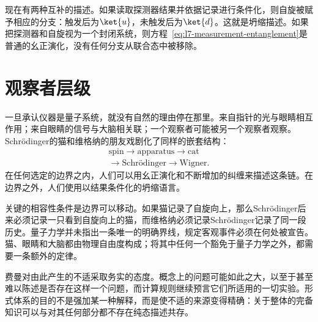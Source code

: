 现在有两种互补的描述。如果读取探测器结果并依据记录进行条件化，则自旋被赋予相应的分支：触发后为\(\ket{u}\)，未触发后为\(\ket{d}\)。这就是坍缩描述。如果把探测器和自旋视为一个封闭系统，则方程~\eqref{eq:l7-measurement-entanglement}是普通的幺正演化，没有任何分支从联合态中被移除。

\begin{classroomqa}
\end{classroomqa}

\begin{classroomqa}
\end{classroomqa}

\section{观察者层级}

一旦承认仪器是量子系统，就没有自然的理由停在那里。来自指针的光与眼睛相互作用；来自眼睛的信号与大脑相关联；一个观察者可能被另一个观察者观察。Schr\"odinger的猫和维格纳的朋友戏剧化了同样的嵌套结构：
\begin{equation}
\begin{gathered}
\text{spin}
\longrightarrow
\text{apparatus}
\longrightarrow
\text{cat}\\
\longrightarrow
\text{Schr\"odinger}
\longrightarrow
\text{Wigner}.
\end{gathered}
\label{eq:l7-observer-chain}
\end{equation}
在任何选定的边界之内，人们可以用幺正演化和不断增加的纠缠来描述这条链。在边界之外，人们使用以结果条件化的坍缩语言。

关键的相容性条件是边界可以移动。如果猫记录了自旋向上，那么Schr\"odinger后来必须记录一只看到自旋向上的猫，而维格纳必须记录Schr\"odinger记录了同一段历史。量子力学并未指出一条唯一的明确界线，规定客观事件必须在何处被宣告。猫、眼睛和大脑都由物理自由度构成；将其中任何一个豁免于量子力学之外，都需要一条额外的定律。

费曼对由此产生的不适采取务实的态度。概念上的问题可能如此之大，以至于甚至难以陈述是否存在这样一个问题，而计算规则继续预言它们所适用的一切实验。形式体系的目的不是强加某一种解释，而是使不适的来源变得精确：关于整体的完备知识可以与对其任何部分都不存在纯态描述共存。

